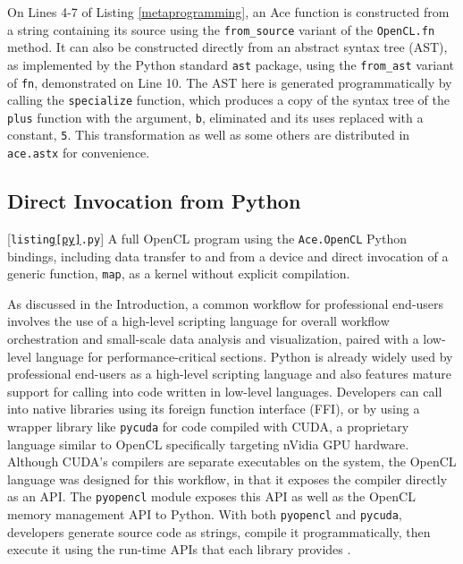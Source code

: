 \documentclass{sig-alternate}
\begin{document}
On Lines 4-7 of Listing \ref{metaprogramming}, an Ace function is constructed from a string containing its source using the \verb|from_source| variant of the \verb|OpenCL.fn| method. It can also be constructed directly from an abstract syntax tree (AST), as implemented by the Python standard \verb|ast| package, using the \verb|from_ast| variant of \verb|fn|, demonstrated on Line 10. The AST here is generated programmatically by calling the \verb|specialize| function, which produces a copy of the syntax tree of the \verb|plus| function with the argument, \verb|b|, eliminated and its uses replaced with a constant, \verb|5|. This transformation as well as some others are distributed in \verb|ace.astx| for convenience.
\subsection{Direct Invocation from Python}\label{direct}

\begin{codelisting}

\caption{[\texttt{listing\ref{py}.py}] A full OpenCL program using the \texttt{Ace.OpenCL} Python bindings, including data transfer to and from a device and direct invocation of a generic function, \texttt{map}, as a kernel without explicit compilation.}
\label{py}
\end{codelisting}

As discussed in the Introduction, a common workflow for professional end-users involves the use of a high-level scripting language for overall workflow orchestration and small-scale data analysis and visualization, paired with a low-level language for performance-critical sections. Python is already widely used by professional end-users as a high-level scripting language and also features mature support for calling into code written in low-level languages. Developers can call into native libraries using its foreign function interface (FFI),  or by using a wrapper library like \verb|pycuda| for code compiled with CUDA, a proprietary language similar to OpenCL  specifically targeting nVidia GPU hardware. 
Although CUDA's compilers are separate executables on the system, the OpenCL language was designed for this workflow, in that it exposes the compiler directly as an API. The \verb|pyopencl| module exposes this API as well as the OpenCL memory management API to Python. With both \verb|pyopencl| and \verb|pycuda|, developers generate source code as strings, compile it programmatically, then execute it using the run-time APIs that each library provides \cite{pyopencl}.
\end{document}
